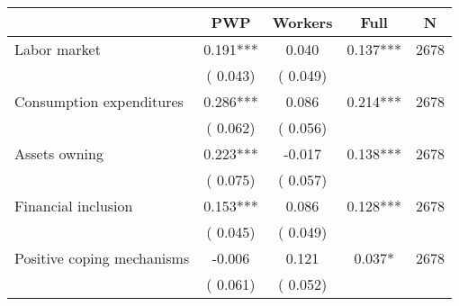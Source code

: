 
\begin{tabular}{l*{4}{c}}\hline&\multicolumn{1}{c}{PWP}&\multicolumn{1}{c}{Workers}&\multicolumn{1}{c}{Full}&\multicolumn{1}{c}{N} \\ \hline

 Labor market &              0.191*** &         0.040 &           0.137*** & 2678                       \\  
                 &        (       0.043)                   &        (       0.049)                        &                                                             &                                                      \\      

 Consumption expenditures &              0.286*** &         0.086 &           0.214*** & 2678                       \\  
                 &        (       0.062)                   &        (       0.056)                        &                                                             &                                                      \\      

 Assets owning &              0.223*** &        -0.017 &           0.138*** & 2678                       \\  
                 &        (       0.075)                   &        (       0.057)                        &                                                             &                                                      \\      

 Financial inclusion &              0.153*** &         0.086 &           0.128*** & 2678                       \\  
                 &        (       0.045)                   &        (       0.049)                        &                                                             &                                                      \\      

 Positive coping mechanisms &             -0.006 &         0.121 &           0.037* & 2678                       \\  
                 &        (       0.061)                   &        (       0.052)                        &                                                             &                                                      \\      


\end{tabular}
